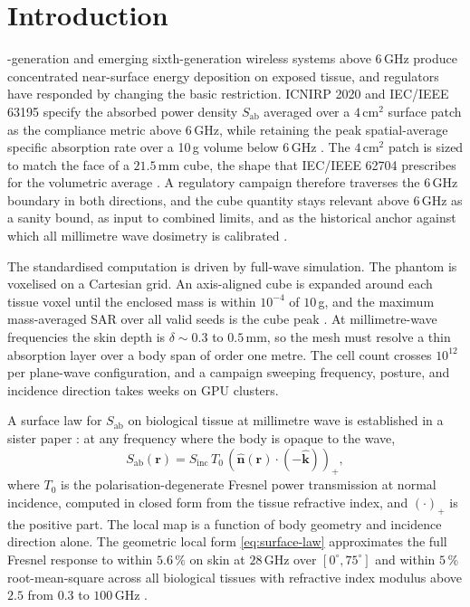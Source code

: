 \documentclass[journal,twocolumn,10pt]{IEEEtran}
\theoremstyle{plain}
\theoremstyle{remark}
\newcommand{\khat}{\hat{\bm{k}}}
\newcommand{\nhat}{\hat{\bm{n}}}
\newcommand{\rr}{\mathbf{r}}
\newcommand{\Sinc}{S_{\mathrm{inc}}}
\newcommand{\Sab}{S_{\mathrm{ab}}}
\newcommand{\pospart}[1]{\left(#1\right)_{+}}
\begin{document}
\section{Introduction}\label{sec:intro}
-generation and emerging sixth-generation
wireless systems above 6\,GHz produce concentrated near-surface
energy deposition on exposed tissue, and regulators have responded
by changing the basic restriction. ICNIRP 2020 and IEC/IEEE 63195
specify the absorbed power density $\Sab$ averaged over a
$4\,\mathrm{cm}^2$ surface patch as the compliance metric above
6\,GHz, while retaining the peak spatial-average specific absorption
rate over a 10\,g volume below 6\,GHz \cite{ICNIRP2020}. The
$4\,\mathrm{cm}^2$ patch is sized to match the face of a $21.5\,$mm
cube, the shape that IEC/IEEE 62704 prescribes for the volumetric
average \cite{ICNIRP2020}. A regulatory campaign therefore traverses
the 6\,GHz boundary in both directions, and the cube quantity stays
relevant above 6\,GHz as a sanity bound, as input to combined
limits, and as the historical anchor against which all millimetre
wave dosimetry is calibrated \cite{Hirata2021,Samaras2019}.

The standardised computation is driven by full-wave simulation. The
phantom is voxelised on a Cartesian grid. An axis-aligned cube is
expanded around each tissue voxel until the enclosed mass is within
$10^{-4}$ of $10\,$g, and the maximum mass-averaged SAR over all
valid seeds is the cube peak \cite{C953,62704-1}. At millimetre-wave
frequencies the skin depth is $\delta \sim 0.3$ to $0.5\,$mm, so the
mesh must resolve a thin absorption layer over a body span of order
one metre. The cell count crosses $10^{12}$ per plane-wave
configuration, and a campaign sweeping frequency, posture, and
incidence direction takes weeks on GPU clusters.

A surface law for $\Sab$ on biological tissue at millimetre wave is
established in a sister paper \cite{WydaegheTAP_A}: at any frequency
where the body is opaque to the wave,
\begin{equation}\label{eq:surface-law}
  \Sab(\rr) = \Sinc \, T_0 \, \pospart{\nhat(\rr) \cdot (-\khat)},
\end{equation}
where $T_0$ is the polarisation-degenerate Fresnel power
transmission at normal incidence, computed in closed form from the
tissue refractive index, and $\pospart{\cdot}$ is the positive
part. The local map is a function of body geometry and incidence
direction alone. The geometric local form
\eqref{eq:surface-law} approximates the full Fresnel response to
within $5.6\,\%$ on skin at $28\,$GHz over $[0^\circ, 75^\circ]$ and
within $5\,\%$ root-mean-square across all biological tissues with
refractive index modulus above $2.5$ from $0.3$ to $100\,$GHz
\cite{WydaegheTAP_A}.
\end{document}
